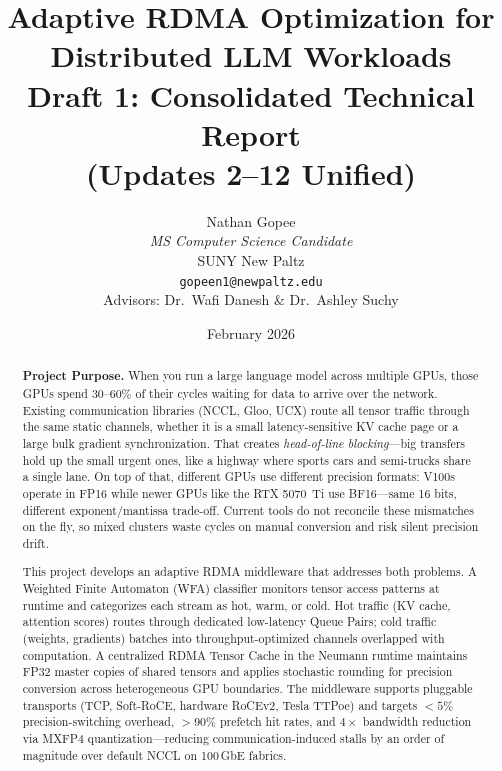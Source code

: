 \documentclass[11pt,letterpaper]{article}
\title{
    \vspace{-1cm}
    \textbf{Adaptive RDMA Optimization for Distributed LLM Workloads} \\[0.5em]
    \large Draft 1: Consolidated Technical Report\\
    \normalsize (Updates 2--12 Unified)
}
\author{
    Nathan Gopee \\
    \textit{MS Computer Science Candidate} \\
    SUNY New Paltz \\
    \texttt{gopeen1@newpaltz.edu} \\[1em]
    \small Advisors: Dr.\ Wafi Danesh \& Dr.\ Ashley Suchy
}
\date{February 2026}
\theoremstyle{definition}
\begin{document}
\maketitle

\begin{abstract}
\noindent
\textbf{Project Purpose.}
When you run a large language model across multiple GPUs, those GPUs spend 30--60\% of their cycles waiting for data to arrive over the network. Existing communication libraries (NCCL, Gloo, UCX) route all tensor traffic through the same static channels, whether it is a small latency-sensitive KV cache page or a large bulk gradient synchronization. That creates \emph{head-of-line blocking}---big transfers hold up the small urgent ones, like a highway where sports cars and semi-trucks share a single lane. On top of that, different GPUs use different precision formats: V100s operate in FP16 while newer GPUs like the RTX 5070~Ti use BF16---same 16 bits, different exponent/mantissa trade-off. Current tools do not reconcile these mismatches on the fly, so mixed clusters waste cycles on manual conversion and risk silent precision drift.

This project develops an adaptive RDMA middleware that addresses both problems. A Weighted Finite Automaton (WFA) classifier monitors tensor access patterns at runtime and categorizes each stream as hot, warm, or cold. Hot traffic (KV cache, attention scores) routes through dedicated low-latency Queue Pairs; cold traffic (weights, gradients) batches into throughput-optimized channels overlapped with computation. A centralized RDMA Tensor Cache in the Neumann runtime maintains FP32 master copies of shared tensors and applies stochastic rounding for precision conversion across heterogeneous GPU boundaries. The middleware supports pluggable transports (TCP, Soft-RoCE, hardware RoCEv2, Tesla TTPoe) and targets ${<}5$\% precision-switching overhead, ${>}90$\% prefetch hit rates, and $4\times$ bandwidth reduction via MXFP4 quantization---reducing communication-induced stalls by an order of magnitude over default NCCL on 100\,GbE fabrics.
\end{abstract}

\newpage
\tableofcontents
\newpage


\end{document}
